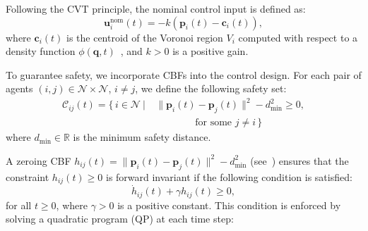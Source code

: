 \documentclass[fleqn,10pt,twocolumn]{main}
\begin{document}
Following the CVT principle, the nominal control input is defined as:
\begin{equation}
    \boldsymbol{u}_{i}^{\mathrm{nom}}(t) = -k(\boldsymbol{p}_{i}(t) - \boldsymbol{c}_{i}(t)),
\end{equation}
where $\boldsymbol{c}_i(t)$ is the centroid of the Voronoi region $V_i$ computed with respect to a density function $\phi(\boldsymbol{q}, t)$~\cite{Cortes_04}, and $k > 0$ is a positive gain.


To guarantee safety, we incorporate CBFs into the control design. For each pair of agents $(i,j)\in \mathcal{N} \times \mathcal{N}$, $i\ne j$, we define the following safety set:
\begin{equation}
\begin{aligned}
\mathcal{C}_{ij}(t) = \bigg\{\, i \in \mathcal{N} \ \bigg|\ 
& \|\boldsymbol{p}_i(t) - \boldsymbol{p}_j(t)\|^2 
  - d_{\mathrm{min}}^2 \geq 0,  
\\
& \qquad\qquad\text{for some } j \ne i \,\bigg\}
\end{aligned}
\end{equation}
where $d_{\mathrm{min}}\in \mathbb{R}$ is the minimum safety distance.

A zeroing CBF $h_{ij}(t) = \|\boldsymbol{p}_i(t) - \boldsymbol{p}_j(t)\|^2 - d_{\mathrm{min}}^2$  (see~\cite{Ames2017}) ensures that the constraint $h_{ij}(t) \geq 0$ is forward invariant if the following condition is satisfied:
\begin{equation}
    \dot{h}_{ij}(t) + \gamma h_{ij}(t) \geq 0,
\end{equation}
 for all $t\geq 0$, where $\gamma > 0$ is a positive constant. This condition is enforced by solving a quadratic program (QP) at each time step:
\end{document}
